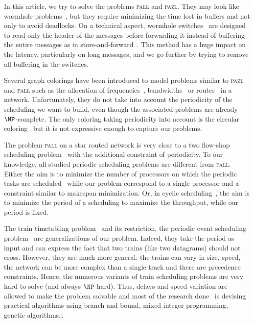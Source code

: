 \documentclass[a4paper,10pt]{journal}
\newcommand\pazl{\textsc{pazl}\xspace}
\newcommand\pall{\textsc{pall}\xspace}
\begin{document}
In this article, we try to solve the problems \pall and \pazl. They may look like wormhole problems~\cite{ni1993survey,cole1996benefit}, but they require minimizing the time lost in buffers and not only to avoid deadlocks. On a technical aspect, wormhole switches~\cite{cole1996benefit} are designed to read only the header of the messages before forwarding it instead of buffering the entire messages as in store-and-forward~\cite{tindell1992store}. This method has a huge impact on the latency, particularly on long messages, and we go further by trying to remove all buffering in the switches.

 Several graph colorings have been introduced to model problems similar to \pazl and \pall such as the allocation of frequencies~\cite{borndorfer1998frequency}, bandwidths~\cite{erlebach2001complexity} or routes~\cite{cole1996benefit} in a network. Unfortunately, they do not take into account the periodicity of the scheduling we want to build, even though the associated problems are already $\NP$-complete. The only coloring taking periodicity into account is the circular coloring~\cite{ZHU2001371,zhou2013multiple} but it is not expressive enough to capture our problems. 

The problem \pall on a star routed network is very close to a two flow-shop scheduling problem~\cite{yu2004minimizing} with the additional constraint of periodicity. To our knowledge, all studied periodic scheduling problems are different from \pall. Either the aim is to minimize the number of processors on which the periodic tasks are scheduled~\cite{korst1991periodic,hanen1993cyclic} while our problem correspond to a single processor and a constraint similar to makespan minimization. Or, in cyclic scheduling~\cite{levner2010complexity}, the aim is to minimize the period of a scheduling to maximize the throughput, while our period is fixed. 

The train timetabling problem~\cite{lusby2011railway} and its restriction, the periodic event scheduling problem~\cite{serafini1989mathematical} are generalizations of our problem. Indeed, they take the period as input and can express the fact that two trains (like two datagrams) should not cross. However, they are much more general: the trains can vary in size, speed, the network can be more complex than a single track and there are precedence constraints. Hence, the numerous variants of train scheduling problems are very hard to solve (and always $\NP$-hard). Thus, delays and speed variation are allowed to make the problem solvable and most of the research done~\cite{lusby2011railway} is devising practical algorithms using branch and bound, mixed integer programming, genetic algorithms\dots
\end{document}
